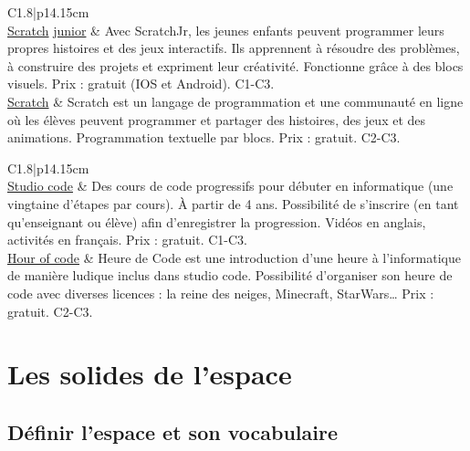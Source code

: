 {\begin{Ltableau}{\linewidth}{2}{C{1.8}|p{14.15cm}}
   \hline
    \\
   \hline
   \href{https://www.scratchjr.org}{\blue Scratch} \href{https://www.scratchjr.org}{\blue junior}
   &
   Avec ScratchJr, les jeunes enfants peuvent programmer leurs propres histoires et des jeux interactifs. Ils apprennent à résoudre des problèmes, à construire des projets et expriment leur créativité. Fonctionne grâce à des blocs visuels. Prix : gratuit (IOS et Android). C1-C3. \\
   \hline
   \href{https://scratch.mit.edu}{\blue Scratch}
   &
   Scratch est un langage de programmation et une communauté en ligne où les élèves peuvent programmer et partager des histoires, des jeux et des animations. Programmation textuelle par blocs. Prix : gratuit. C2-C3. \\
   \hline
\end{Ltableau}


\begin{Ltableau}{\linewidth}{2}{C{1.8}|p{14.15cm}}
   \hline
    \\
   \hline
   \href{https://studio.code.org/courses}{\blue Studio code}
   &
   Des cours de code progressifs pour débuter en informatique (une vingtaine d'étapes par cours). À partir de 4 ans. Possibilité de s'inscrire (en tant qu'enseignant ou élève) afin d'enregistrer la progression. Vidéos en anglais, activités en français. Prix : gratuit. C1-C3. \\
   \hline
   \href{https://hourofcode.com/fr/learn}{\blue Hour of code}
   &
   Heure de Code est une introduction d'une heure à l'informatique de manière ludique inclus dans studio code. Possibilité d'organiser son heure de code avec diverses licences : la reine des neiges, Minecraft, StarWars\dots{} Prix : gratuit. C2-C3. \\
   \hline
\end{Ltableau}}



\section{Les solides de l'espace}

\subsection{Définir l'espace et son vocabulaire}

